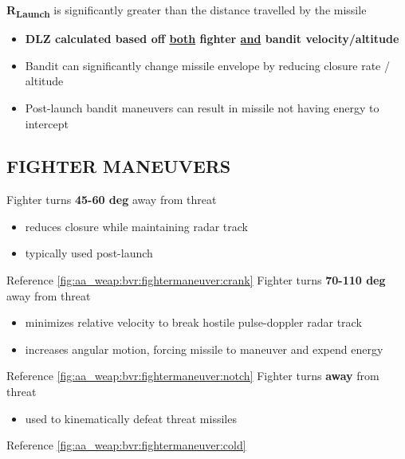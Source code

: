 \begin{tcoloritemize}
   \textbf{R\textsubscript{Launch}} is significantly greater than the distance travelled by the missile
    \begin{itemize}
        \item \textbf{DLZ calculated based off \underline{both} fighter \underline{and} bandit velocity/altitude}
        \item Bandit can significantly change missile envelope by reducing closure rate / altitude
        \item Post-launch bandit maneuvers can result in missile not having energy to intercept
    \end{itemize}
\end{tcoloritemize}

\clearpage

\subsection{FIGHTER MANEUVERS}

\begin{tcoloritemize}
    \blueitem[Crank]
    Fighter turns \textbf{45-60 deg} away from threat 

    \begin{itemize}
        \item reduces closure while maintaining radar track
        \item typically used post-launch
    \end{itemize}
    
    Reference \cref{fig:aa_weap:bvr:fightermaneuver:crank}
    \blueitem[Notch]
    Fighter turns \textbf{70-110 deg} away from threat

    \begin{itemize}
        \item minimizes relative velocity to break hostile pulse-doppler radar track
        \item increases angular motion, forcing missile to maneuver and expend energy
    \end{itemize}
    
    Reference \cref{fig:aa_weap:bvr:fightermaneuver:notch}
    \blueitem[Go Cold]
    Fighter turns \textbf{away} from threat

    \begin{itemize}
        \item used to kinematically defeat threat missiles
    \end{itemize}
    
    Reference \cref{fig:aa_weap:bvr:fightermaneuver:cold}
\end{tcoloritemize}

